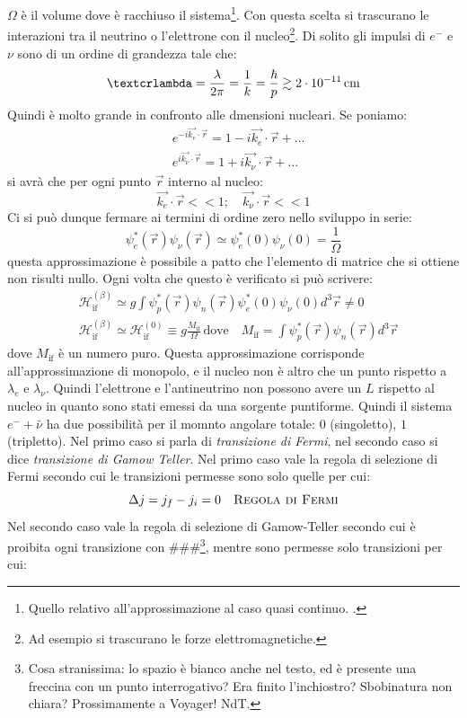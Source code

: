 $\Omega$ è il volume dove è racchiuso il sistema\footnote{Quello relativo all'approssimazione al caso quasi continuo. .}.
Con questa scelta si trascurano le interazioni tra il neutrino o l'elettrone con il nucleo\footnote{Ad esempio si trascurano le forze elettromagnetiche. }.
Di solito gli impulsi di $e^-$ e $\nu$ sono di un ordine di grandezza tale che:
\[
  \text{\textcrlambda}=\frac{\lambda}{2\pi}=\frac{1}{k}=\frac{\hbar}{p}\gtrsim2\cdot10^{-11}\,\si{\centi\meter}
\]
Quindi \textcrlambda è molto grande in confronto alle dmensioni nucleari. Se poniamo:
\begin{align*}
&e^{-i\vec{k_e}\cdot\vec{r}}=1-i\vec{k_e}\cdot\vec{r}+\dots\\
&e^{i\vec{k_{\nu}}\cdot\vec{r}}=1+i\vec{k_{\nu}}\cdot\vec{r}+\dots
\end{align*}
si avrà che per ogni punto $\vec{r}$ interno al nucleo:
\[
\vec{k_e}\cdot\vec{r}<<1;\quad\vec{k_{\nu}}\cdot\vec{r}<<1
\]
Ci si può dunque fermare ai termini di ordine zero nello sviluppo in serie:
\[
\psi_e^*(\vec{r})\psi_{\nu}(\vec{r})\simeq\psi_e^*(0)\psi_{\nu}(0)=\frac{1}{\Omega}
\]
questa approssimazione è possibile a patto che l'elemento di matrice che si ottiene non risulti nullo. Ogni volta che questo è verificato si può scrivere:
\begin{align*}
&\mathcal{H}_{\text{if}}^{(\beta)}\simeq g\int\psi_p^*(\vec{r})\psi_n(\vec{r})\psi_e^*(0)\psi_{\nu}(0)d^3\vec{r}\neq0\\
&\mathcal{H}_{\text{if}}^{(\beta)}\simeq\mathcal{H}_{\text{if}}^{(0)}\equiv g\frac{M_{\text{if}}}{\Omega}\,\text{dove}\quad M_{\text{if}}=\int\psi_p^*(\vec{r})\psi_n(\vec{r})d^3\vec{r}
\end{align*}
dove $M_{\text{if}}$ è un numero puro. Questa approssimazione corrisponde all'approssimazione di monopolo, e il nucleo non è altro che un punto rispetto a $\lambda_e$ e $\lambda_{\nu}$.
Quindi l'elettrone e l'antineutrino non possono avere un $L$ rispetto al nucleo
in quanto sono stati emessi da una sorgente puntiforme. Quindi il sistema $e^-+\bar{\nu}$ ha due possibilità
per il momnto angolare totale: $0$ (singoletto), $1$ (tripletto). Nel primo caso
si parla di \textit{transizione di Fermi}, nel secondo caso si dice \textit{transizione di Gamow Teller}.
Nel primo caso vale la regola di selezione di Fermi secondo cui le transizioni permesse sono solo quelle per cui:
\[
  \Delta j=j_f-j_i=0\quad\text{\textsc{Regola di Fermi}}
\]
Nel secondo caso vale la regola di selezione di Gamow-Teller secondo cui è
proibita ogni transizione con \#\#\#\footnote{Cosa stranissima: lo spazio è
bianco anche nel testo, ed è presente una freccina
con un punto interrogativo? Era finito l'inchiostro? Sbobinatura non chiara?
Prossimamente a Voyager! NdT.}, mentre sono permesse solo transizioni per cui:
